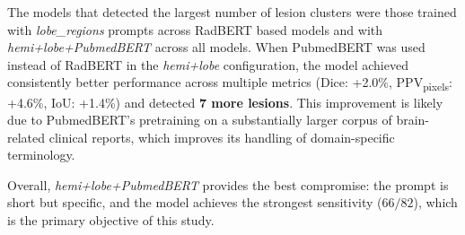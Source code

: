 \documentclass[a4paper,12pt]{article}
\begin{document}
The models that detected the largest number of lesion clusters were those trained with \textit{lobe\_regions} prompts across RadBERT based models and with \textit{hemi+lobe+PubmedBERT} across all models. When PubmedBERT was used instead of RadBERT in the \textit{hemi+lobe} configuration, the model achieved consistently better performance across multiple metrics 
(Dice: +2.0\%, PPV\textsubscript{pixels}: +4.6\%, IoU: +1.4\%) and detected \textbf{7 more lesions}. This improvement is likely due to PubmedBERT’s pretraining on a substantially larger corpus of brain-related clinical reports, which improves its handling of domain-specific terminology.

Overall, \textit{hemi+lobe+PubmedBERT} provides the best compromise: the prompt is short but specific, and the model achieves the strongest sensitivity (\(66/82\)), which is the primary objective of this study.
\end{document}
